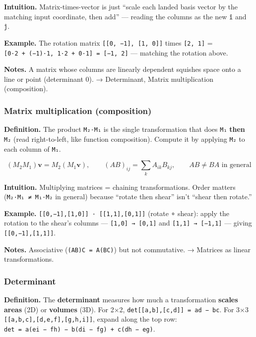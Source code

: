 \documentclass[
  10pt,
  letterpaper,
  onecolumn]{article}
\begin{document}
\textbf{Intuition.} Matrix-times-vector is just ``scale each landed
basis vector by the matching input coordinate, then add'' --- reading
the columns as the new \texttt{î} and \texttt{ĵ}.

\textbf{Example.} The rotation matrix
\texttt{{[}{[}0,\ −1{]},\ {[}1,\ 0{]}{]}} times \texttt{{[}2,\ 1{]}} =
\texttt{{[}0·2\ +\ (−1)·1,\ 1·2\ +\ 0·1{]}\ =\ {[}−1,\ 2{]}} ---
matching the rotation above.

\textbf{Notes.} A matrix whose columns are linearly dependent squishes
space onto a line or point (determinant 0). → Determinant, Matrix
multiplication (composition).

\hypertarget{matrix-multiplication-composition}{%
\subsubsection{Matrix multiplication
(composition)}\label{matrix-multiplication-composition}}

\textbf{Definition.} The product \texttt{M₂·M₁} is the single
transformation that does \texttt{M₁} \textbf{then} \texttt{M₂} (read
right-to-left, like function composition). Compute it by applying
\texttt{M₂} to each column of \texttt{M₁}.

\begin{equation*}
(M_2M_1)\mathbf{v}=M_2(M_1\mathbf{v}),
\qquad
(AB)_{ij}=\sum_{k}A_{ik}B_{kj},
\qquad
AB\ne BA \text{ in general}
\end{equation*}

\textbf{Intuition.} Multiplying matrices = chaining transformations.
Order matters (\texttt{M₂·M₁\ ≠\ M₁·M₂} in general) because ``rotate
then shear'' isn't ``shear then rotate.''

\textbf{Example.}
\texttt{{[}{[}0,−1{]},{[}1,0{]}{]}\ ·\ {[}{[}1,1{]},{[}0,1{]}{]}}
(rotate ∘ shear): apply the rotation to the shear's columns ---
\texttt{{[}1,0{]}\ →\ {[}0,1{]}} and \texttt{{[}1,1{]}\ →\ {[}−1,1{]}}
--- giving \texttt{{[}{[}0,−1{]},{[}1,1{]}{]}}.

\textbf{Notes.} Associative (\texttt{(AB)C\ =\ A(BC)}) but not
commutative. → Matrices as linear transformations.

\hypertarget{determinant}{%
\subsubsection{Determinant}\label{determinant}}

\textbf{Definition.} The \textbf{determinant} measures how much a
transformation \textbf{scales areas} (2D) or \textbf{volumes} (3D). For
2×2, \texttt{det{[}{[}a,b{]},{[}c,d{]}{]}\ =\ ad\ −\ bc}. For 3×3
\texttt{{[}{[}a,b,c{]},{[}d,e,f{]},{[}g,h,i{]}{]}}, expand along the top
row: \texttt{det\ =\ a(ei\ −\ fh)\ −\ b(di\ −\ fg)\ +\ c(dh\ −\ eg)}.
\end{document}
